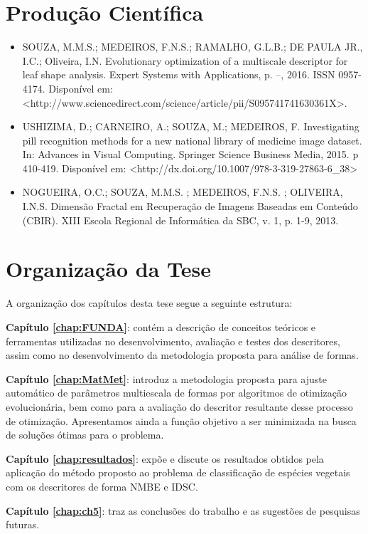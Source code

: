 \section {Produção Científica \label{sec:prod_cientif}}
\begin{itemize}

\item SOUZA, M.M.S.; MEDEIROS, F.N.S.; RAMALHO, G.L.B.; DE PAULA JR., I.C.; Oliveira, I.N. Evolutionary optimization of a multiscale descriptor for leaf
shape analysis. Expert Systems with Applications, p. –, 2016. ISSN 0957-4174. Disponível
em: <http://www.sciencedirect.com/science/article/pii/S095741741630361X>.

\item USHIZIMA, D.; CARNEIRO, A.; SOUZA, M.; MEDEIROS, F. Investigating pill recognition methods for a new national library of
medicine image dataset. In: Advances in Visual Computing. Springer Science Business Media, 2015. p 410-419. Disponível em: <http://dx.doi.org/10.1007/978-3-319-27863-6\_38>


\item NOGUEIRA, O.C.; SOUZA, M.M.S. ; MEDEIROS, F.N.S. ; OLIVEIRA, I.N.S. Dimensão Fractal em Recuperação de Imagens Baseadas em Conteúdo (CBIR). XIII Escola Regional de Informática da SBC, v. 1, p. 1-9, 2013.

\end{itemize}
\section{Organização da Tese \label{sec:org}}

A organização dos capítulos desta tese segue a seguinte estrutura:

\noindent \textbf{Capítulo \ref{chap:FUNDA}}: contém a descrição de conceitos teóricos e ferramentas utilizadas no desenvolvimento, avaliação e testes dos descritores, assim como no desenvolvimento da metodologia proposta para análise de formas.

\noindent \textbf{Capítulo \ref{chap:MatMet}}:  introduz a metodologia proposta para ajuste automático de parâmetros multiescala de formas por algoritmos de otimização evolucionária, bem como para a avaliação do descritor resultante desse processo de otimização. Apresentamos ainda a função objetivo a ser minimizada na busca de soluções ótimas para o problema.

\noindent \textbf{Capítulo \ref{chap:resultados}}: expõe e discute os resultados obtidos pela aplicação do método proposto ao problema de classificação de espécies vegetais com os descritores de forma \ac{NMBE} e \ac{IDSC}.

\noindent \textbf{Capítulo \ref{chap:ch5}}: traz as conclusões do trabalho e as sugestões de pesquisas futuras. 

